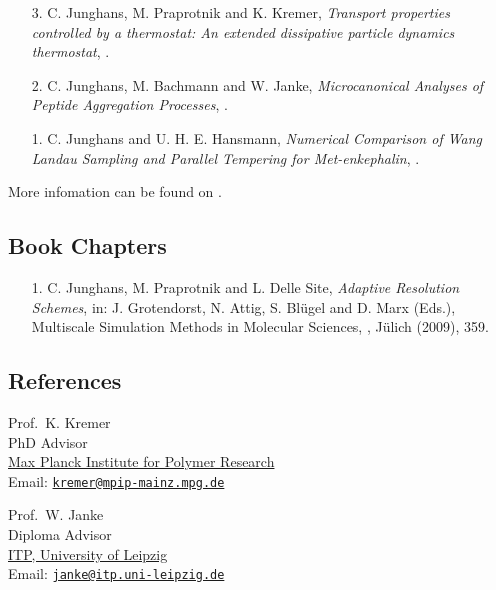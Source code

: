 \documentclass{article}
\begin{document}
\begin{enumerate}
\item[3.] C. Junghans, M. Praprotnik and K. Kremer,
  \textit{Transport properties controlled by a thermostat: An extended dissipative particle dynamics thermostat},
  .

\item[2.] C. Junghans, M. Bachmann and W. Janke,
  \textit{Microcanonical Analyses of Peptide Aggregation Processes},
  .

\item[1.] C. Junghans and U. H. E. Hansmann,
  \textit{Numerical Comparison of Wang Landau Sampling and Parallel Tempering for Met-enkephalin}, 
  .
\end{enumerate}

More infomation can be found on .

\subsection*{Book Chapters}

\begin{enumerate}
\item[1.] C. Junghans, M. Praprotnik and L. Delle Site,
  \textit{Adaptive Resolution Schemes},
  in: J. Grotendorst, N. Attig, S. Bl{\"u}gel and D. Marx (Eds.),
  Multiscale Simulation Methods in Molecular Sciences, , J{\"u}lich (2009), 359.
\end{enumerate}

\subsection*{References}

\begin{minipage}{0.45\linewidth}
Prof.\ K. Kremer
\vspace{-2mm}\\
{\tiny PhD Advisor}\\
\href{http://www.mpip-mainz.mpg.de}{Max Planck Institute for Polymer Research} \\
Email: \href{mailto:kremer@mpip-mainz.mpg.de}{\tt kremer@mpip-mainz.mpg.de}
\end{minipage}
\begin{minipage}{0.45\linewidth}
Prof.\ W. Janke
\vspace{-2mm}\\
{\tiny Diploma Advisor}\\
\href{http://www.physik.uni-leipzig.de/~janke/}{ITP, University of Leipzig} \\
Email: \href{mailto:janke@itp.uni-leipzig.de}{\tt janke@itp.uni-leipzig.de}
\end{minipage}
\end{document}
